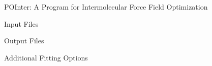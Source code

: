 \begin{chapter}{POInter: A Program for Intermolecular Force Field Optimization}
\begin{subappendices}
\begin{section}{\pointer Input Files}

\end{section}
\begin{section}{\pointer Output Files}

\end{section}
\begin{section}{Additional Fitting Options}

\end{section}
\end{subappendices}

\end{chapter}
